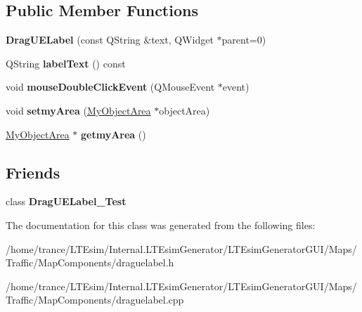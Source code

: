 \subsection*{Public Member Functions}
\begin{DoxyCompactItemize}
\item 
{\bfseries Drag\+U\+E\+Label} (const Q\+String \&text, Q\+Widget $\ast$parent=0)\hypertarget{class_drag_u_e_label_a0d91ab68fcf7eef05836beb52fa0aa86}{}\label{class_drag_u_e_label_a0d91ab68fcf7eef05836beb52fa0aa86}

\item 
Q\+String {\bfseries label\+Text} () const \hypertarget{class_drag_u_e_label_a31cf6bfb3c49f8845a25eb2c1a1710b2}{}\label{class_drag_u_e_label_a31cf6bfb3c49f8845a25eb2c1a1710b2}

\item 
void {\bfseries mouse\+Double\+Click\+Event} (Q\+Mouse\+Event $\ast$event)\hypertarget{class_drag_u_e_label_a3c6e6d530c44133e9d4b047001e0192d}{}\label{class_drag_u_e_label_a3c6e6d530c44133e9d4b047001e0192d}

\item 
void {\bfseries setmy\+Area} (\hyperlink{class_my_object_area}{My\+Object\+Area} $\ast$object\+Area)\hypertarget{class_drag_u_e_label_a5438d265f61c4d8955bb02ac77bd2453}{}\label{class_drag_u_e_label_a5438d265f61c4d8955bb02ac77bd2453}

\item 
\hyperlink{class_my_object_area}{My\+Object\+Area} $\ast$ {\bfseries getmy\+Area} ()\hypertarget{class_drag_u_e_label_a368ba405088b1a017d3eb76e026162e0}{}\label{class_drag_u_e_label_a368ba405088b1a017d3eb76e026162e0}

\end{DoxyCompactItemize}
\subsection*{Friends}
\begin{DoxyCompactItemize}
\item 
class {\bfseries Drag\+U\+E\+Label\+\_\+\+Test}\hypertarget{class_drag_u_e_label_a846982edde3dbd494a3dac23b5c9ece7}{}\label{class_drag_u_e_label_a846982edde3dbd494a3dac23b5c9ece7}

\end{DoxyCompactItemize}


The documentation for this class was generated from the following files\+:\begin{DoxyCompactItemize}
\item 
/home/trance/\+L\+T\+Esim/\+Internal.\+L\+T\+Esim\+Generator/\+L\+T\+Esim\+Generator\+G\+U\+I/\+Maps/\+Traffic/\+Map\+Components/draguelabel.\+h\item 
/home/trance/\+L\+T\+Esim/\+Internal.\+L\+T\+Esim\+Generator/\+L\+T\+Esim\+Generator\+G\+U\+I/\+Maps/\+Traffic/\+Map\+Components/draguelabel.\+cpp\end{DoxyCompactItemize}
